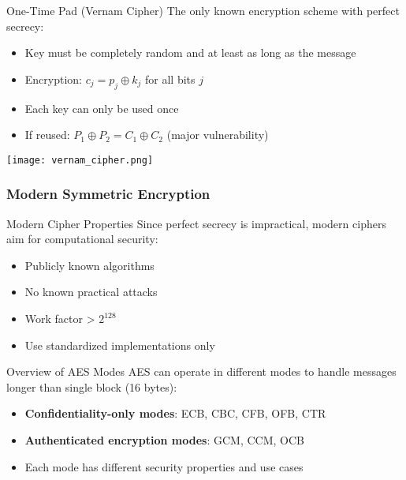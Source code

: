 \begin{concept}{One-Time Pad (Vernam Cipher)}
    The only known encryption scheme with perfect secrecy:
    \begin{itemize}
        \item Key must be completely random and at least as long as the message
        \item Encryption: $c_j = p_j \oplus k_j$ for all bits $j$
        \item Each key can only be used once
        \item If reused: $P_1 \oplus P_2 = C_1 \oplus C_2$ (major vulnerability)
    \end{itemize}
    \texttt{[image: vernam\_cipher.png]}
\end{concept}

\multend

\subsubsection{Modern Symmetric Encryption}


\begin{concept}{Modern Cipher Properties}
    Since perfect secrecy is impractical, modern ciphers aim for computational security:
    \begin{itemize}
        \item Publicly known algorithms
        \item No known practical attacks
        \item Work factor > $2^{128}$
        \item Use standardized implementations only
    \end{itemize}
\end{concept}

\begin{theorem}{Overview of AES Modes}
AES can operate in different modes to handle messages longer than single block (16 bytes):
\begin{itemize}
    \item \textbf{Confidentiality-only modes}: ECB, CBC, CFB, OFB, CTR
    \item \textbf{Authenticated encryption modes}: GCM, CCM, OCB
    \item Each mode has different security properties and use cases
\end{itemize}
\end{theorem}




